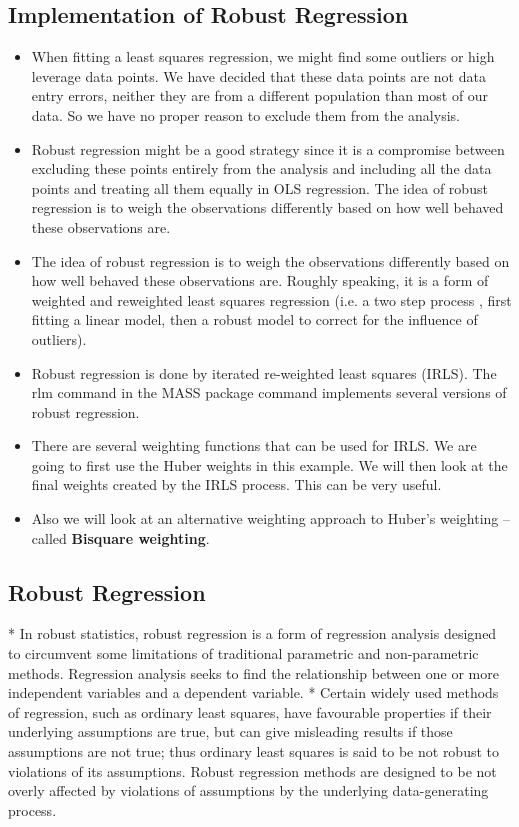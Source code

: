 \documentclass[residuals.tex]{subfiles}
\begin{document}
\subsection{Implementation of Robust Regression}
\begin{itemize}
\item When fitting a least squares regression, we might find some outliers or high leverage data points.  We have decided that these data points are not data entry errors, neither they are from a different population than most of our data. So we have no proper reason to exclude them from the analysis.  

\item Robust regression might be a good strategy since it is a compromise between excluding these points entirely from the analysis and including all the data points and treating all them equally in OLS regression. The idea of robust regression is to weigh the observations differently based on how well behaved these observations are.

\item 
The idea of robust regression is to weigh the observations differently based on how well behaved these observations are. Roughly speaking, it is a form of weighted and reweighted least squares regression (i.e. a two step process , first fitting a linear model, then a robust model to correct for the influence of outliers).
\item 
Robust regression is done by iterated re-weighted least squares (IRLS). The rlm command in the MASS package command implements several versions of robust regression.
\item 
There are several weighting functions that can be used for IRLS. We are going to first use the Huber weights in this example. We will then look at the final weights created by the IRLS process. This can be very useful. 
\item 
Also we will look at an alternative weighting approach to Huber’s weighting – called \textbf{Bisquare weighting}. 
\end{itemize}

\subsection*{Robust Regression }

* In robust statistics, robust regression is a form of regression analysis designed to circumvent some 
limitations of traditional parametric and non-parametric methods. Regression analysis seeks to find the 
relationship between one or more independent variables and a dependent variable. 
* Certain widely used methods of regression, such as ordinary least squares, have favourable properties if their
underlying assumptions are true, but can give misleading results if those assumptions are not true; thus
ordinary least squares is said to be not robust to violations of its assumptions. Robust regression methods are designed to be not overly affected by violations of assumptions by the underlying data-generating process.
\end{document}
